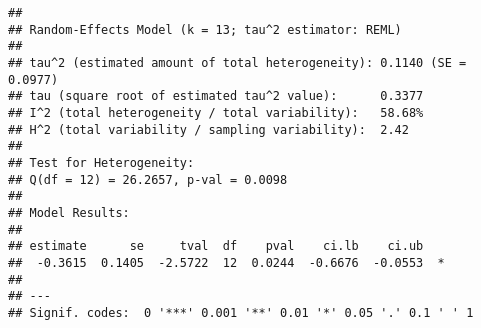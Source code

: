 \documentclass[
]{article}
\newenvironment{Shaded}{\begin{snugshade}}{\end{snugshade}}
\newcommand{\DecValTok}[1]{\textcolor[rgb]{0.00,0.00,0.81}{#1}}
\newcommand{\DocumentationTok}[1]{\textcolor[rgb]{0.56,0.35,0.01}{\textbf{\textit{#1}}}}
\newcommand{\FunctionTok}[1]{\textcolor[rgb]{0.13,0.29,0.53}{\textbf{#1}}}
\newcommand{\NormalTok}[1]{#1}
\newcommand{\SpecialCharTok}[1]{\textcolor[rgb]{0.81,0.36,0.00}{\textbf{#1}}}
\newcommand{\StringTok}[1]{\textcolor[rgb]{0.31,0.60,0.02}{#1}}
\begin{document}
\begin{verbatim}
## 
## Random-Effects Model (k = 13; tau^2 estimator: REML)
## 
## tau^2 (estimated amount of total heterogeneity): 0.1140 (SE = 0.0977)
## tau (square root of estimated tau^2 value):      0.3377
## I^2 (total heterogeneity / total variability):   58.68%
## H^2 (total variability / sampling variability):  2.42
## 
## Test for Heterogeneity:
## Q(df = 12) = 26.2657, p-val = 0.0098
## 
## Model Results:
## 
## estimate      se     tval  df    pval    ci.lb    ci.ub    
##  -0.3615  0.1405  -2.5722  12  0.0244  -0.6676  -0.0553  * 
## 
## ---
## Signif. codes:  0 '***' 0.001 '**' 0.01 '*' 0.05 '.' 0.1 ' ' 1
\end{verbatim}

\begin{Shaded}
\end{Shaded}
\end{document}
